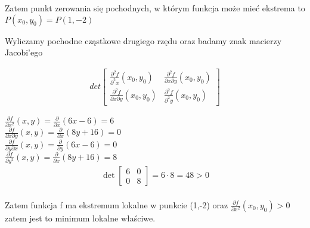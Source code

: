 \documentclass[main.tex]{subfiles}
\begin{document}
\begin{itemize}
        Zatem punkt zerowania się pochodnych, w którym funkcja może mieć ekstrema to $P(x_0,y_0) = P(1,-2)$

        Wyliczamy pochodne cząstkowe drugiego rzędu oraz badamy znak macierzy Jacobi'ego

        \begin{equation}
            \begin{aligned}
                det \begin{bmatrix}
                        \frac{\partial^2 f}{\partial^2 x}(x_0, y_0) & \frac{\partial^2 f}{\partial x \partial y}(x_0, y_0) \\
                        \frac{\partial^2 f}{\partial x \partial y}(x_0, y_0) & \frac{\partial^2 f}{\partial^2 y}(x_0, y_0)
                \end{bmatrix}
            \end{aligned}
        \end{equation}
        \newpage

        $\frac{\partial f}{\partial x^2} (x,y) = \frac{\partial}{\partial x} \left( 6x - 6 \right) = 6$
        \\

        $\frac{\partial f}{\partial x \partial y} (x,y)  =  \frac{\partial}{\partial x} \left( 8y + 16 \right) = 0$
        \\

        $\frac{\partial f}{\partial y \partial x} (x,y) = \frac{\partial}{\partial y} \left( 6x - 6 \right) = 0$
        \\

        $\frac{\partial f}{\partial y^2} (x,y)  = \frac{\partial}{\partial x} \left( 8y + 16 \right) = 8$
        \\

        \begin{align}
            \det \begin{bmatrix}
                     6 & 0 \\
                     0 & 8
            \end{bmatrix} = 6 \cdot 8 = 48 > 0
        \end{align}
        \\

        Zatem funkcja f ma ekstremum lokalne w punkcie (1,-2) oraz $\frac{\partial f}{\partial x^2}(x_0, y_0) > 0$ zatem jest to minimum lokalne właściwe.

    \end{itemize}
    \newpage
\end{document}
